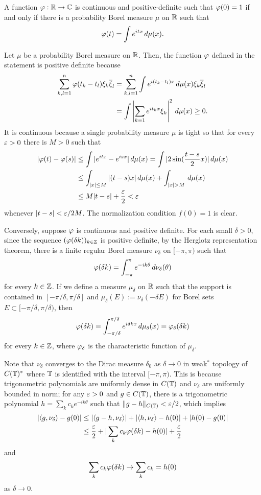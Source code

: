\documentclass[a4paper]{article}
\begin{document}
\begin{cor}
A function $\varphi:\mathbb{R}\to\mathbb{C}$ is continuous and positive-definite such that $\varphi(0)=1$ if and only if there is a probability Borel measure $\mu$ on $\mathbb{R}$ such that
\[\varphi(t)=\int e^{itx}\,d\mu(x).\]
\end{cor}
\begin{pf}
Let $\mu$ be a probability Borel measure on $\mathbb{R}$.
Then, the function $\varphi$ defined in the statement is positive definite because
\begin{align*}
\sum_{k,l=1}^n\varphi(t_k-t_l)\xi_k\overline\xi_l
&=\sum_{k,l=1}^n\int e^{i(t_k-t_l)x}\,d\mu(x)\xi_k\overline\xi_l\\
&=\int\left|\sum_{k=1}e^{it_kx}\xi_k\right|^2\,d\mu(x)\ge0.
\end{align*}
It is continuous because a single probability measure $\mu$ is tight so that for every $\varepsilon>0$ there is $M>0$ such that
\begin{align*}
|\f(t)-\f(s)|&\le\int|e^{itx}-e^{isx}|\,d\mu(x)
=\int|2\sin(\frac{t-s}2x)|\,d\mu(x)\\
&\le\int_{|x|\le M}|(t-s)x|\,d\mu(x)+\int_{|x|>M}\,d\mu(x)\\
&\le M|t-s|+\frac\e2<\e
\end{align*}
whenever $|t-s|<\varepsilon/2M$.
The normalization condition $f(0)=1$ is clear.

Conversely, suppose $\varphi$ is continuous and positive definite.
For each small $\delta>0$, since the sequence $(\varphi(\delta k))_{k\in\mathbb{Z}}$ is positive definite, by the Herglotz representation theorem, there is a finite regular Borel measure $\nu_\delta$ on $[-\pi,\pi)$ such that
\[\varphi(\delta k)=\int_{-\pi}^\pi e^{-ik\theta}\,d\nu_\delta(\theta)\]
for every $k\in\mathbb{Z}$.
If we define a measure $\mu_\delta$ on $\mathbb{R}$ such that the support is contained in $[-\pi/\delta,\pi/\delta]$ and $\mu_\delta(E):=\nu_\delta(-\delta E)$ for Borel sets $E\subset[-\pi/\delta,\pi/\delta)$, then
\[\varphi(\delta k)=\int_{-\pi/\delta}^{\pi/\delta}e^{i\delta kx}\,d\mu_\delta(x)=\varphi_\delta(\delta k)\]
for every $k\in\mathbb{Z}$, where $\varphi_\delta$ is the characteristic function of $\mu_\delta$.

Note that $\nu_\delta$ converges to the Dirac measure $\delta_0$ as $\delta\to0$ in weak$^*$ topology of $C(\mathbb{T})^*$ where $\mathbb{T}$ is identified with the interval $[-\pi,\pi)$.
This is because trigonometric polynomials are uniformly dense in $C(\mathbb{T})$ and $\nu_\delta$ are uniformly bounded in norm; for any $\varepsilon>0$ and $g\in C(\mathbb{T})$, there is a trigonometric polynomial $h=\sum_kc_ke^{-ik\theta}$ such that $\|g-h\|_{C(\mathbb{T})}<\varepsilon/2$, which implies
\begin{align*}
|\langle g,\nu_\delta\rangle-g(0)|
&\le|\langle g-h,\nu_\delta\rangle|+|\langle h,\nu_\delta\rangle-h(0)|+|h(0)-g(0)|\\
&\le\frac{\varepsilon}2+|\sum_kc_k\varphi(\delta k)-h(0)|+\frac{\varepsilon}2
\end{align*}
and
\[\sum_kc_k\varphi(\delta k)\to\sum_kc_k=h(0)\]
as $\delta\to0$.


\end{pf}
\end{document}
